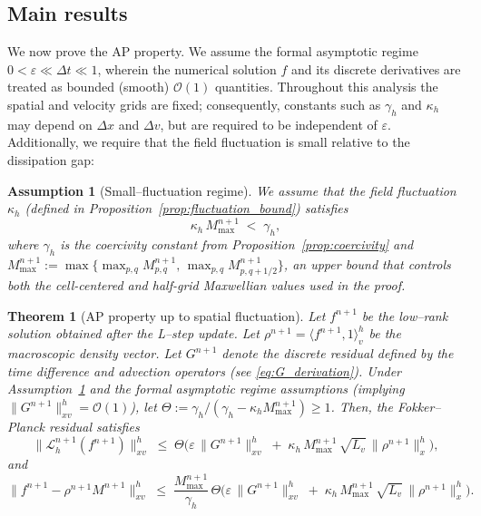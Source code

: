 \documentclass[]{article}
\numberwithin{equation}{section}
\newtheorem{theorem}{Theorem}[section]
\newtheorem{assumption}{Assumption}[section]
\newcommand{\modifysecond}[1]{#1}
\begin{document}
\subsection{Main results}

We now prove the AP property. We assume the formal asymptotic regime $0 < \varepsilon \ll \Delta t \ll 1$, wherein the numerical solution $f$ and its discrete derivatives are treated as bounded (smooth) $\mathcal{O}(1)$ quantities. \modifysecond{Throughout this analysis the spatial and velocity grids are fixed; consequently, constants such as $\gamma_h$ and $\kappa_h$ may depend on $\Delta x$ and $\Delta v$, but are required to be independent of $\varepsilon$.} Additionally, we require that the field fluctuation is small relative to the dissipation gap:

\begin{assumption}[Small--fluctuation regime]\label{asm:small_fluct}
We assume that the field fluctuation $\kappa_h$ (defined in Proposition~\ref{prop:fluctuation_bound}) satisfies
\begin{equation}\label{eq:regime_condition}
    \kappa_h \, M_{\max}^{n+1} \;<\; \gamma_h,
\end{equation}
where $\gamma_h$ is the coercivity constant from Proposition~\ref{prop:coercivity} and $M_{\max}^{n+1} := \max\!\big\{ \max_{p,q} M_{p,q}^{n+1},\, \max_{p,q} M_{p,q+1/2}^{n+1}\big\}$, an upper bound that controls both the cell-centered and half-grid Maxwellian values used in the proof.
\end{assumption}

\begin{theorem}[AP property up to spatial fluctuation]
\label{thm:main_AP}
Let $f^{n+1}$ be the low--rank solution obtained after the L--step update. Let $\rho^{n+1} = \langle f^{n+1}, 1 \rangle_v^h$ be the macroscopic density vector. Let $G^{n+1}$ denote the discrete residual defined by the time difference and advection operators (see \eqref{eq:G_derivation}). Under Assumption~\ref{asm:small_fluct} and the formal asymptotic regime assumptions (implying $\|G^{n+1}\|_{xv}^h = \mathcal{O}(1)$), let $\Theta := \gamma_h / (\gamma_h - \kappa_h M_{\max}^{n+1}) \ge 1$. Then, the Fokker--Planck residual satisfies
\begin{equation}\label{eq:residual_bound}
  \big\|\mathcal L_{h}^{n+1}(f^{n+1})\big\|_{xv}^h
  \;\le\;
  \Theta \Big( \varepsilon\,\|G^{n+1}\|_{xv}^h \;+\; \kappa_h\,M_{\max}^{n+1}\,\sqrt{L_v}\,\big\|\rho^{n+1}\big\|_x^h \Big),
\end{equation}
and 
\begin{equation}\label{eq:distance_bound}
  \big\|f^{n+1}-\rho^{n+1} M^{n+1}\big\|_{xv}^h
  \;\le\;
  \frac{M_{\max}^{n+1}}{\gamma_h}\,\Theta \Big( \varepsilon\,\|G^{n+1}\|_{xv}^h \;+\; \kappa_h\,M_{\max}^{n+1}\,\sqrt{L_v}\,\big\|\rho^{n+1}\big\|_x^h \Big).
\end{equation}
\end{theorem}
\end{document}
